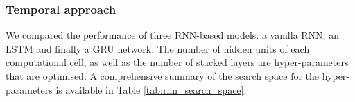 \subsubsection{Temporal approach}
We compared the performance of three RNN-based models: a vanilla RNN, an LSTM and finally a GRU network. The number of hidden units of each computational cell, as well as the number of stacked layers are hyper-parameters that are optimised. A comprehensive summary of the search space for the hyper-parameters is available in Table \ref{tab:rnn_search_space}. 

